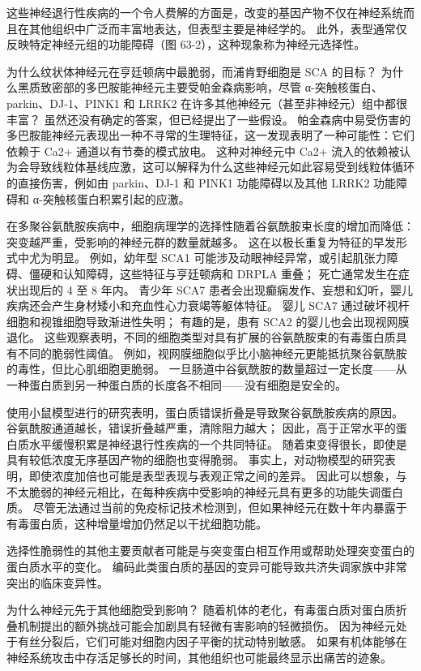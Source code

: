 这些神经退行性疾病的一个令人费解的方面是，改变的基因产物不仅在神经系统而且在其他组织中广泛而丰富地表达，但表型主要是神经学的。 此外，表型通常仅反映特定神经元组的功能障碍（图 63-2），这种现象称为神经元选择性。

为什么纹状体神经元在亨廷顿病中最脆弱，而浦肯野细胞是 SCA 的目标？ 为什么黑质致密部的多巴胺能神经元主要受帕金森病影响，尽管 α-突触核蛋白、parkin、DJ-1、PINK1 和 LRRK2 在许多其他神经元（甚至非神经元）组中都很丰富？ 虽然还没有确定的答案，但已经提出了一些假设。 帕金森病中易受伤害的多巴胺能神经元表现出一种不寻常的生理特征，这一发现表明了一种可能性：它们依赖于 Ca2+ 通道以有节奏的模式放电。 这种对神经元中 Ca2+ 流入的依赖被认为会导致线粒体基线应激，这可以解释为什么这些神经元如此容易受到线粒体循环的直接伤害，例如由 parkin、DJ-1 和 PINK1 功能障碍以及其他 LRRK2 功能障碍和 α-突触核蛋白积累引起的应激。

在多聚谷氨酰胺疾病中，细胞病理学的选择性随着谷氨酰胺束长度的增加而降低：突变越严重，受影响的神经元群的数量就越多。 这在以极长重复为特征的早发形式中尤为明显。 例如，幼年型 SCA1 可能涉及动眼神经异常，或引起肌张力障碍、僵硬和认知障碍，这些特征与亨廷顿病和 DRPLA 重叠； 死亡通常发生在症状出现后的 4 至 8 年内。 青少年 SCA7 患者会出现癫痫发作、妄想和幻听，婴儿疾病还会产生身材矮小和充血性心力衰竭等躯体特征。 婴儿 SCA7 通过破坏视杆细胞和视锥细胞导致渐进性失明； 有趣的是，患有 SCA2 的婴儿也会出现视网膜退化。 这些观察表明，不同的细胞类型对具有扩展的谷氨酰胺束的有毒蛋白质具有不同的脆弱性阈值。 例如，视网膜细胞似乎比小脑神经元更能抵抗聚谷氨酰胺的毒性，但比心肌细胞更脆弱。 一旦肠道中谷氨酰胺的数量超过一定长度——从一种蛋白质到另一种蛋白质的长度各不相同——没有细胞是安全的。

使用小鼠模型进行的研究表明，蛋白质错误折叠是导致聚谷氨酰胺疾病的原因。 谷氨酰胺通道越长，错误折叠越严重，清除阻力越大； 因此，高于正常水平的蛋白质水平缓慢积累是神经退行性疾病的一个共同特征。 随着束变得很长，即使是具有较低浓度无序基因产物的细胞也变得脆弱。 事实上，对动物模型的研究表明，即使浓度加倍也可能是表型表现与表观正常之间的差异。 因此可以想象，与不太脆弱的神经元相比，在每种疾病中受影响的神经元具有更多的功能失调蛋白质。 尽管无法通过当前的免疫标记技术检测到，但如果神经元在数十年内暴露于有毒蛋白质，这种增量增加仍然足以干扰细胞功能。

选择性脆弱性的其他主要贡献者可能是与突变蛋白相互作用或帮助处理突变蛋白的蛋白质水平的变化。 编码此类蛋白质的基因的变异可能导致共济失调家族中非常突出的临床变异性。

为什么神经元先于其他细胞受到影响？ 随着机体的老化，有毒蛋白质对蛋白质折叠机制提出的额外挑战可能会加剧具有轻微有害影响的轻微损伤。 因为神经元处于有丝分裂后，它们可能对细胞内因子平衡的扰动特别敏感。 如果有机体能够在神经系统攻击中存活足够长的时间，其他组织也可能最终显示出痛苦的迹象。

